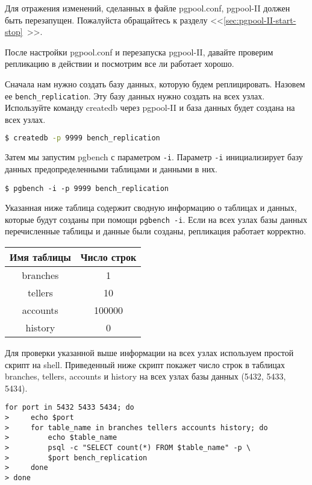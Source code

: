 Для отражения изменений, сделанных в файле pgpool.conf, pgpool-II должен быть перезапущен. Пожалуйста обращайтесь к разделу <<\ref{sec:pgpool-II-start-stop}~>>.

После настройки pgpool.conf и перезапуска pgpool-II, давайте проверим репликацию в действии и посмотрим все ли работает хорошо.

Сначала нам нужно создать базу данных, которую будем реплицировать. Назовем ее \lstinline!bench_replication!. Эту базу данных нужно создать на всех узлах. Используйте команду createdb через pgpool-II и база данных будет создана на всех узлах.

\begin{lstlisting}[language=Bash,label=lst:pgpool19,caption=Проверка репликации]
$ createdb -p 9999 bench_replication
\end{lstlisting}

Затем мы запустим pgbench с параметром \lstinline!-i!. Параметр \lstinline!-i! инициализирует базу данных предопределенными таблицами и данными в них.

\begin{lstlisting}[label=lst:pgpool20,caption=Проверка репликации]
$ pgbench -i -p 9999 bench_replication
\end{lstlisting}

Указанная ниже таблица содержит сводную информацию о таблицах и данных, которые будут созданы при помощи \lstinline!pgbench -i!. Если на всех узлах базы данных перечисленные таблицы и данные были созданы, репликация работает корректно.

\begin{tabular}{ | c | c | }
  \hline
  Имя таблицы & Число строк \\
  \hline
  branches & 1 \\
  \hline
  tellers & 10 \\
  \hline
  accounts & 100000 \\
  \hline
  history & 0 \\
  \hline
\end{tabular}

Для проверки указанной выше информации на всех узлах используем простой скрипт на shell. Приведенный ниже скрипт покажет число строк в таблицах branches, tellers, accounts и history на всех узлах базы данных (5432, 5433, 5434).

\begin{lstlisting}[label=lst:pgpool21,caption=Проверка репликации]
for port in 5432 5433 5434; do
>     echo $port
>     for table_name in branches tellers accounts history; do
>         echo $table_name
>         psql -c "SELECT count(*) FROM $table_name" -p \
>         $port bench_replication
>     done
> done
\end{lstlisting}


